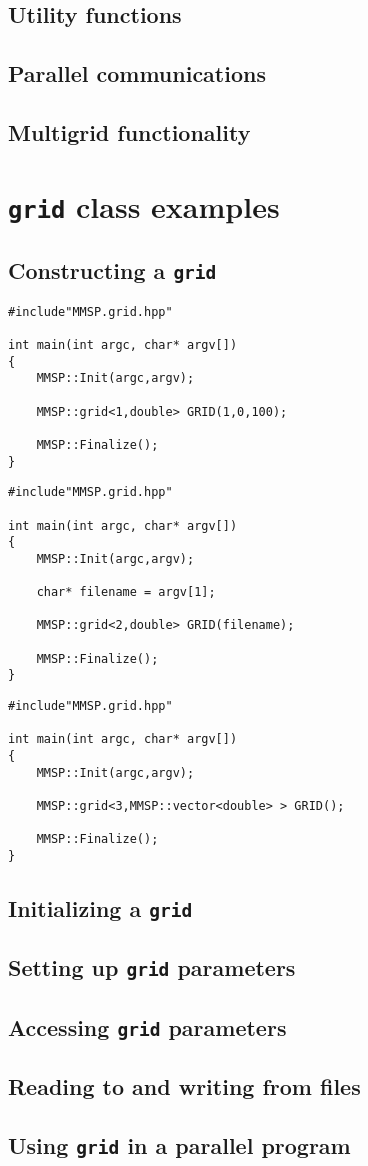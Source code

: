 \subsection{Utility functions}


\subsection{Parallel communications}

\subsection{Multigrid functionality}


\section{{\tt grid} class examples}

\subsection{Constructing a {\tt grid}}
\begin{verbatim}
#include"MMSP.grid.hpp"

int main(int argc, char* argv[])
{
    MMSP::Init(argc,argv);

	MMSP::grid<1,double> GRID(1,0,100);

    MMSP::Finalize();
}
\end{verbatim}

\begin{verbatim}
#include"MMSP.grid.hpp"

int main(int argc, char* argv[])
{
    MMSP::Init(argc,argv);

    char* filename = argv[1];

	MMSP::grid<2,double> GRID(filename);

    MMSP::Finalize();
}
\end{verbatim}

\begin{verbatim}
#include"MMSP.grid.hpp"

int main(int argc, char* argv[])
{
    MMSP::Init(argc,argv);

	MMSP::grid<3,MMSP::vector<double> > GRID();

    MMSP::Finalize();
}
\end{verbatim}
\subsection{Initializing a {\tt grid}}
\subsection{Setting up {\tt grid} parameters}
\subsection{Accessing {\tt grid} parameters}
\subsection{Reading to and writing from files}
\subsection{Using {\tt grid} in a parallel program}

